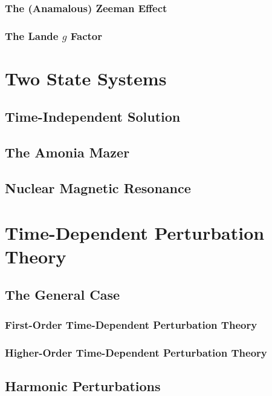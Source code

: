 \documentclass[12pt]{extarticle}
\theoremstyle{definition}
\begin{document}
\subsubsection{The (Anamalous) Zeeman Effect}

\subsubsection{The Lande $g$ Factor}



\section{Two State Systems}

\subsection{Time-Independent Solution}

\subsection{The Amonia Mazer}

\subsection{Nuclear Magnetic Resonance}


\section{Time-Dependent Perturbation Theory}

\subsection{The General Case}

\subsubsection{First-Order Time-Dependent Perturbation Theory}

\subsubsection{Higher-Order Time-Dependent Perturbation Theory}

\subsection{Harmonic Perturbations}
\end{document}
